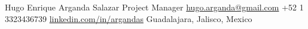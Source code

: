 
\customheader
    {Hugo Enrique Arganda Salazar}
    {Project Manager}
    {\href{mailto:hugo.arganda@gmail.com}{hugo.arganda@gmail.com}}
    {+52 1 3323436739}
    {\href{https://www.linkedin.com/in/argandas}{linkedin.com/in/argandas}}
    {Guadalajara, Jalisco, Mexico}
